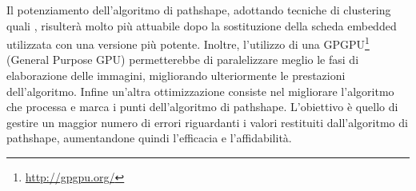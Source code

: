     Il potenziamento dell'algoritmo di pathshape, adottando tecniche di clustering quali \cite{linedetect}, risulterà molto più attuabile dopo la sostituzione della scheda embedded utilizzata con una versione più potente. Inoltre, l'utilizzo di una GPGPU\footnote{\url{http://gpgpu.org/}} (General Purpose GPU) permetterebbe di paralelizzare meglio le fasi di elaborazione delle immagini, migliorando ulteriormente le prestazioni dell'algoritmo. Infine un'altra ottimizzazione consiste nel migliorare l'algoritmo che processa e marca i punti dell'algoritmo di pathshape. L'obiettivo è quello di gestire un maggior numero di errori riguardanti i valori restituiti dall'algoritmo di pathshape, aumentandone quindi l'efficacia e l'affidabilità.
